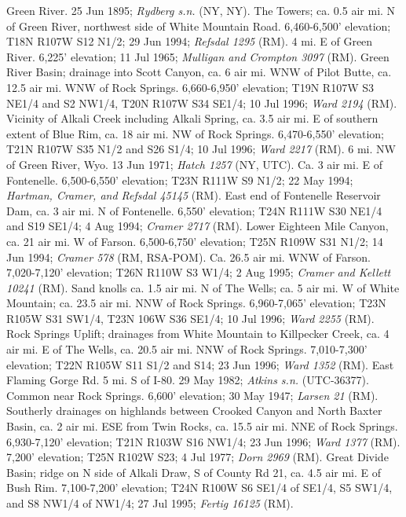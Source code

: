 Green River. 25 Jun 1895; \textit{Rydberg s.n.} (NY, NY).
The Towers; ca. 0.5 air mi. N of Green River, northwest side of White Mountain
Road. 6,460-6,500' elevation; T18N R107W S12 N1/2; 29 Jun 1994;
\textit{Refsdal 1295} (RM).
4 mi. E of Green River. 6,225' elevation; 11 Jul 1965;
\textit{Mulligan and Crompton 3097} (RM).
Green River Basin; drainage into Scott Canyon, ca. 6 air mi. WNW of Pilot Butte,
ca. 12.5 air mi. WNW of Rock Springs. 6,660-6,950' elevation;
T19N R107W S3 NE1/4 and S2 NW1/4, T20N R107W S34 SE1/4; 10 Jul 1996;
\textit{Ward 2194} (RM).
Vicinity of Alkali Creek including Alkali Spring, ca. 3.5 air mi. E of southern
extent of Blue Rim, ca. 18 air mi. NW of Rock Springs. 6,470-6,550' elevation;
T21N R107W S35 N1/2 and S26 S1/4; 10 Jul 1996; \textit{Ward 2217} (RM).
6 mi. NW of Green River, Wyo. 13 Jun 1971; \textit{Hatch 1257} (NY, UTC).
Ca. 3 air mi. E of Fontenelle.  6,500-6,550' elevation;
T23N R111W S9 N1/2; 22 May 1994; \textit{Hartman, Cramer, and Refsdal 45145} (RM).
East end of Fontenelle Reservoir Dam, ca. 3 air mi. N of Fontenelle. 6,550'
elevation; T24N R111W S30 NE1/4 and S19 SE1/4; 4 Aug 1994; \textit{Cramer 2717} (RM).
Lower Eighteen Mile Canyon, ca. 21 air mi. W of Farson. 6,500-6,750' elevation;
T25N R109W S31 N1/2; 14 Jun 1994; \textit{Cramer 578} (RM, RSA-POM).
Ca. 26.5 air mi. WNW of Farson. 7,020-7,120' elevation; T26N R110W S3 W1/4;
2 Aug 1995; \textit{Cramer and Kellett 10241} (RM).
Sand knolls ca. 1.5 air mi. N of The Wells; ca. 5 air mi. W of White Mountain;
ca. 23.5 air mi. NNW of Rock Springs. 6,960-7,065' elevation; T23N R105W S31
SW1/4, T23N 106W S36 SE1/4; 10 Jul 1996; \textit{Ward 2255} (RM).
Rock Springs Uplift; drainages from White Mountain to Killpecker Creek, ca. 4
air mi. E of The Wells, ca. 20.5 air mi. NNW of Rock Springs. 7,010-7,300'
elevation; T22N R105W S11 S1/2 and S14; 23 Jun 1996; \textit{Ward 1352} (RM).
East Flaming Gorge Rd. 5 mi. S of I-80. 29 May 1982;
\textit{Atkins s.n.} (UTC-36377).
Common near Rock Springs. 6,600' elevation; 30 May 1947; \textit{Larsen 21} (RM).
Southerly drainages on highlands between Crooked Canyon and North Baxter Basin,
ca. 2 air mi. ESE from Twin Rocks, ca. 15.5 air mi. NNE of Rock Springs.
6,930-7,120' elevation; T21N R103W S16 NW1/4; 23 Jun 1996; \textit{Ward 1377} (RM).
7,200' elevation; T25N R102W S23; 4 Jul 1977; \textit{Dorn 2969} (RM).
Great Divide Basin; ridge on N side of Alkali Draw, S of County Rd 21, ca. 4.5
air mi. E of Bush Rim. 7,100-7,200' elevation; T24N R100W S6 SE1/4 of SE1/4,
S5 SW1/4, and S8 NW1/4 of NW1/4; 27 Jul 1995; \textit{Fertig 16125} (RM).
